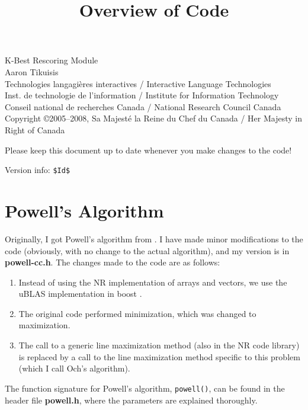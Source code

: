 \documentclass[12pt]{amsart}
\newcommand{\file}{\textbf} \newcommand{\url}{\underline}
\newcommand{\code}[1]{{\small \texttt{#1}}}
\begin{document}
\title{Overview of Code} \maketitle

{\tiny
 \noindent K-Best Rescoring Module\\ Aaron Tikuisis\\
 Technologies langagi{\`e}res interactives / Interactive Language Technologies\\
 Inst. de technologie de l'information / Institute for Information Technology\\
 Conseil national de recherches Canada / National Research Council Canada\\
 Copyright \copyright 2005--2008, Sa Majest{\'e} la Reine du Chef du Canada /
     Her Majesty in Right of Canada
}

\noindent
Please keep this document up to date whenever you make changes to the code!

{\tiny
\noindent
Version info: \verb+$Id$+
}
\\

\section*{Powell's Algorithm}

Originally, I got Powell's algorithm from \cite{NR-C++}.  I have made minor
modifications to the code (obviously, with no change to the actual algorithm),
and my version is in \file{powell-cc.h}.  The changes made to the code are
as follows:

\begin{enumerate}
\item Instead of using the NR implementation of arrays and vectors, we use the
      uBLAS implementation in boost \cite{uBLAS}.

\item The original code performed minimization, which was changed to
      maximization.

\item The call to a generic line maximization method (also in the NR code
      library) is replaced by a call to the line maximization method specific
      to this problem (which I call Och's algorithm).
\end{enumerate}

The function signature for Powell's algorithm, \code{powell()}, can be found in
the header file \file{powell.h}, where the parameters are explained thoroughly.
\end{document}
